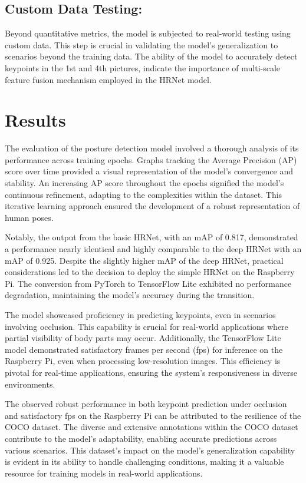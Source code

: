 \documentclass{article}
\begin{document}
\subsection{Custom Data Testing:}
Beyond quantitative metrics, the model is subjected to real-world testing using custom data. This step is crucial in validating the model's generalization to scenarios beyond the training data. The ability of the model to accurately detect keypoints in the 1st and 4th pictures, indicate the importance of multi-scale feature fusion mechanism employed in the HRNet model.



\section{Results}
The evaluation of the posture detection model involved a thorough analysis of its performance across training epochs. Graphs tracking the Average Precision (AP) score over time provided a visual representation of the model's convergence and stability. An increasing AP score throughout the epochs signified the model's continuous refinement, adapting to the complexities within the dataset. This iterative learning approach ensured the development of a robust representation of human poses.

Notably, the output from the basic HRNet, with an mAP of 0.817, demonstrated a performance nearly identical and highly comparable to the deep HRNet with an mAP of 0.925. Despite the slightly higher mAP of the deep HRNet, practical considerations led to the decision to deploy the simple HRNet on the Raspberry Pi. The conversion from PyTorch to TensorFlow Lite exhibited no performance degradation, maintaining the model's accuracy during the transition.

The model showcased proficiency in predicting keypoints, even in scenarios involving occlusion. This capability is crucial for real-world applications where partial visibility of body parts may occur. Additionally, the TensorFlow Lite model demonstrated satisfactory frames per second (fps) for inference on the Raspberry Pi, even when processing low-resolution images. This efficiency is pivotal for real-time applications, ensuring the system's responsiveness in diverse environments.

The observed robust performance in both keypoint prediction under occlusion and satisfactory fps on the Raspberry Pi can be attributed to the resilience of the COCO dataset. The diverse and extensive annotations within the COCO dataset contribute to the model's adaptability, enabling accurate predictions across various scenarios. This dataset's impact on the model's generalization capability is evident in its ability to handle challenging conditions, making it a valuable resource for training models in real-world applications.
\end{document}
